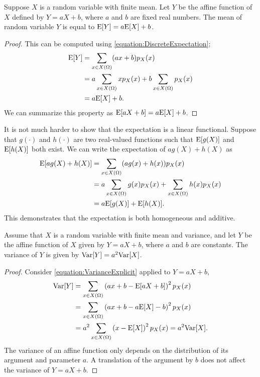 \begin{proposition}
Suppose $X$ is a random variable with finite mean.
Let $Y$ be the affine function of $X$ defined by $Y = aX + b$, where $a$ and $b$ are fixed real numbers.
The mean of random variable $Y$ is equal to $\mathrm{E} [Y] = a \mathrm{E} [X] + b$.
\end{proposition}
\begin{proof}
This can be computed using \eqref{equation:DiscreteExpectation};
\begin{equation*}
\begin{split}
\mathrm{E} [Y] &= \sum_{x \in X(\Omega)} (ax + b) p_X(x) \\
&= a \sum_{x \in X(\Omega)} x p_X(x) + b \sum_{x \in X(\Omega)} p_X(x) \\
&= a \mathrm{E} [X] + b.
\end{split}
\end{equation*}
We can summarize this property as $\mathrm{E} [a X + b] = a \mathrm{E} [X] + b$.
\end{proof}

It is not much harder to show that the expectation is a linear functional.
Suppose that $g(\cdot)$ and $h(\cdot)$ are two real-valued functions such that $\mathrm{E} [g(X)]$ and $\mathrm{E} [h(X)]$ both exist.
We can write the expectation of $a g(X) + h(X)$ as
\begin{equation*}
\begin{split}
\mathrm{E} [ a g(X) + h(X) ] &= \sum_{x \in X(\Omega)} (a g(x) + h(x)) p_X(x) \\
&= a \sum_{x \in X(\Omega)} g(x) p_X(x) + \sum_{x \in X(\Omega)} h(x) p_X(x) \\
&= a \mathrm{E} [g(X)] + \mathrm{E} [h(X)] .
\end{split}
\end{equation*}
This demonstrates that the expectation is both homogeneous and additive.

\begin{proposition}
Assume that $X$ is a random variable with finite mean and variance, and let $Y$ be the affine function of $X$ given by $Y = aX + b$, where $a$ and $b$ are constants.
The variance of $Y$ is given by $\mathrm{Var} [Y] = a^2 \mathrm{Var} [X]$.
\end{proposition}
\begin{proof}
Consider \eqref{equation:VarianceExplicit} applied to $Y = aX + b$,
\begin{equation*}
\begin{split}
\mathrm{Var} [Y]
&= \sum_{x \in X(\Omega)} \left( ax + b - \mathrm{E} [aX + b] \right)^2 p_X(x) \\
&= \sum_{x \in X(\Omega)} \left( ax + b - a \mathrm{E} [X] - b \right)^2 p_X(x) \\
&= a^2 \sum_{x \in X(\Omega)} \left( x - \mathrm{E} [X] \right)^2 p_X(x)
= a^2 \mathrm{Var} [X] .
\end{split}
\end{equation*}
The variance of an affine function only depends on the distribution of its argument and parameter $a$.
A translation of the argument by $b$ does not affect the variance of $Y = aX + b$.
\end{proof}


